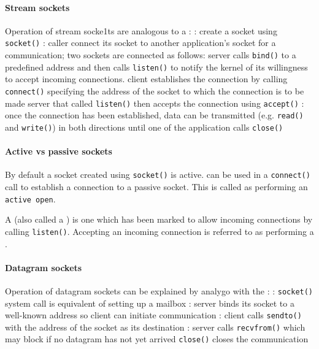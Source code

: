 \documentclass{memo}
\begin{document}
\paragraph{Stream sockets}
Operation of stream socke1ts are analogous to a :
\ben
\w {}: create a socket using \verb+socket()+
\w {}: caller connect its socket to another application's
socket for a communication; two sockets are connected as follows:
  \ben
  \w server calls \verb+bind()+ to a predefined address and then calls
  \verb+listen()+ to notify the kernel of its willingness to accept incoming
  connections.  
  \w client establishes the connection by calling \verb+connect()+ specifying
  the address of the socket to which the connection is to be made
  \w server that called \verb+listen()+ then accepts the connection using
  \verb+accept()+ 
  \een
\w {}: once the connection has been established, data can be
  transmitted (e.g. \verb+read()+ and \verb+write()+) in both directions until
  one of the application calls \verb+close()+
\een

\paragraph{Active vs passive sockets}
By default a socket created using \verb+socket()+ is active.  can be used in a \verb+connect()+ call to establish a connection to
a passive socket. This is called as performing an \verb+active open+.

A  (also called a ) is one which has
been marked to allow incoming connections by calling
\verb+listen()+. Accepting an incoming connection is referred to as performing
a {}. 

\paragraph{Datagram sockets}
Operation of datagram sockets can be explained by analygo with the : 
\ben
\w {}: \verb+socket()+ system call is equivalent of setting up a mailbox
\w {}: server binds its socket to a well-known address so
client can initiate communication
\w {}: client calls \verb+sendto()+ with the address of the
socket as its destination
\w {}: server calls \verb+recvfrom()+ which may block if no
datagram has not yet arrived
\w \verb+close()+ closes the communication
\een
\end{document}
